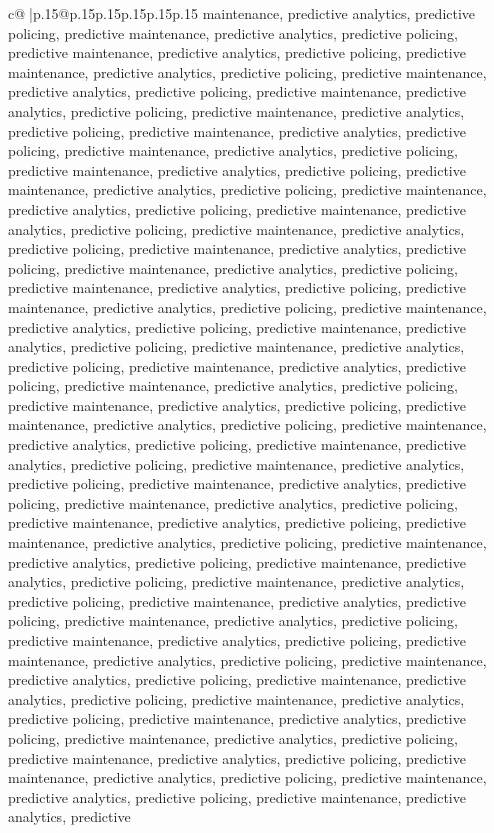 \documentclass{article}
\begin{document}
{\begin{supertabular}{c@{$\;$}|p{.15\linewidth}@{}p{.15\linewidth}p{.15\linewidth}p{.15\linewidth}p{.15\linewidth}p{.15\linewidth}}
{{{maintenance, predictive analytics, predictive policing, predictive maintenance, predictive analytics, predictive policing, predictive maintenance, predictive analytics, predictive policing, predictive maintenance, predictive analytics, predictive policing, predictive maintenance, predictive analytics, predictive policing, predictive maintenance, predictive analytics, predictive policing, predictive maintenance, predictive analytics, predictive policing, predictive maintenance, predictive analytics, predictive policing, predictive maintenance, predictive analytics, predictive policing, predictive maintenance, predictive analytics, predictive policing, predictive maintenance, predictive analytics, predictive policing, predictive maintenance, predictive analytics, predictive policing, predictive maintenance, predictive analytics, predictive policing, predictive maintenance, predictive analytics, predictive policing, predictive maintenance, predictive analytics, predictive policing, predictive maintenance, predictive analytics, predictive policing, predictive maintenance, predictive analytics, predictive policing, predictive maintenance, predictive analytics, predictive policing, predictive maintenance, predictive analytics, predictive policing, predictive maintenance, predictive analytics, predictive policing, predictive maintenance, predictive analytics, predictive policing, predictive maintenance, predictive analytics, predictive policing, predictive maintenance, predictive analytics, predictive policing, predictive maintenance, predictive analytics, predictive policing, predictive maintenance, predictive analytics, predictive policing, predictive maintenance, predictive analytics, predictive policing, predictive maintenance, predictive analytics, predictive policing, predictive maintenance, predictive analytics, predictive policing, predictive maintenance, predictive analytics, predictive policing, predictive maintenance, predictive analytics, predictive policing, predictive maintenance, predictive analytics, predictive policing, predictive maintenance, predictive analytics, predictive policing, predictive maintenance, predictive analytics, predictive policing, predictive maintenance, predictive analytics, predictive policing, predictive maintenance, predictive analytics, predictive policing, predictive maintenance, predictive analytics, predictive policing, predictive maintenance, predictive analytics, predictive policing, predictive maintenance, predictive analytics, predictive policing, predictive maintenance, predictive analytics, predictive policing, predictive maintenance, predictive analytics, predictive policing, predictive maintenance, predictive analytics, predictive policing, predictive maintenance, predictive analytics, predictive policing, predictive maintenance, predictive analytics, predictive policing, predictive maintenance, predictive analytics, predictive policing, predictive maintenance, predictive analytics, predictive policing, predictive maintenance, predictive analytics, predictive policing, predictive maintenance, predictive analytics, predictive policing, predictive maintenance, predictive analytics, predictive }}}
\end{supertabular}}
\end{document}
